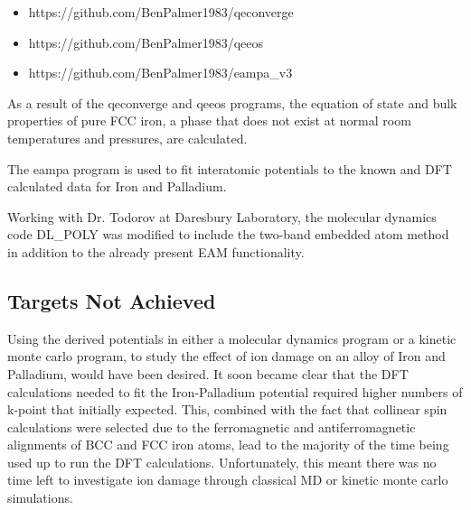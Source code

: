 \begin{itemize}
\item https://github.com/BenPalmer1983/qeconverge
\item https://github.com/BenPalmer1983/qeeos
\item https://github.com/BenPalmer1983/eampa\_v3
\end{itemize}

As a result of the qeconverge and qeeos programs, the equation of state and bulk properties of pure FCC iron, a phase that does not exist at normal room temperatures and pressures, are calculated.  

The eampa program is used to fit interatomic potentials to the known and DFT calculated data for Iron and Palladium.

Working with Dr. Todorov at Daresbury Laboratory, the molecular dynamics code DL_POLY was modified to include the two-band embedded atom method in addition to the already present EAM functionality.


\subsection{Targets Not Achieved}

Using the derived potentials in either a molecular dynamics program or a kinetic monte carlo program, to study the effect of ion damage on an alloy of Iron and Palladium, would have been desired.  It soon became clear that the DFT calculations needed to fit the Iron-Palladium potential required higher numbers of k-point that initially expected.  This, combined with the fact that collinear spin calculations were selected due to the ferromagnetic and antiferromagnetic alignments of BCC and FCC iron atoms, lead to the majority of the time being used up to run the DFT calculations.  Unfortunately, this meant there was no time left to investigate ion damage through classical MD or kinetic monte carlo simulations.







